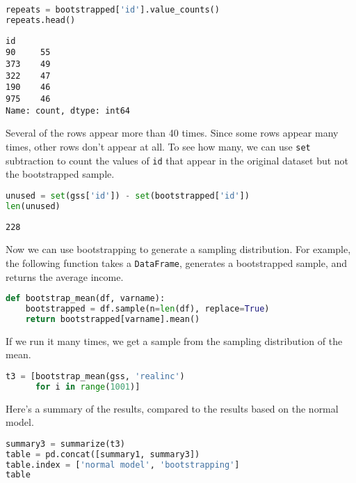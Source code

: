 \begin{lstlisting}[language=Python,style=source]
repeats = bootstrapped['id'].value_counts()
repeats.head()
\end{lstlisting}

\begin{lstlisting}[style=output]
id
90     55
373    49
322    47
190    46
975    46
Name: count, dtype: int64
\end{lstlisting}

Several of the rows appear more than 40 times. Since some rows appear
many times, other rows don't appear at all. To see how many, we can use
\passthrough{\lstinline!set!} subtraction to count the values of
\passthrough{\lstinline!id!} that appear in the original dataset but not
the bootstrapped sample.

\begin{lstlisting}[language=Python,style=source]
unused = set(gss['id']) - set(bootstrapped['id'])
len(unused)
\end{lstlisting}

\begin{lstlisting}[style=output]
228
\end{lstlisting}

Now we can use bootstrapping to generate a sampling distribution. For
example, the following function takes a
\passthrough{\lstinline!DataFrame!}, generates a bootstrapped sample,
and returns the average income.

\begin{lstlisting}[language=Python,style=source]
def bootstrap_mean(df, varname):
    bootstrapped = df.sample(n=len(df), replace=True)
    return bootstrapped[varname].mean()
\end{lstlisting}

If we run it many times, we get a sample from the sampling distribution
of the mean.

\begin{lstlisting}[language=Python,style=source]
t3 = [bootstrap_mean(gss, 'realinc')
      for i in range(1001)]
\end{lstlisting}

Here's a summary of the results, compared to the results based on the
normal model.

\begin{lstlisting}[language=Python,style=source]
summary3 = summarize(t3)
table = pd.concat([summary1, summary3])
table.index = ['normal model', 'bootstrapping']
table
\end{lstlisting}

